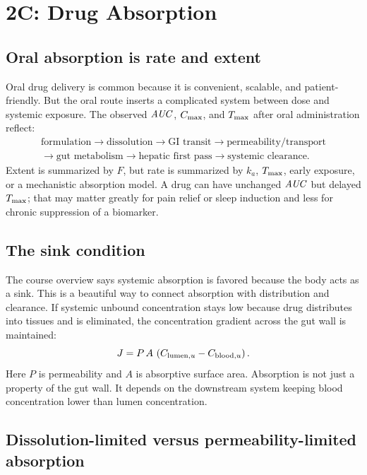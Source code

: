 \documentclass[a4paper]{article}
\newcommand{\AUC}{\ensuremath{\pksym{AUC}}}
\newcommand{\Cmax}{\ensuremath{C_{\pklab{max}}}}
\newcommand{\Tmax}{\ensuremath{T_{\pklab{max}}}}
\newcommand{\Fbio}{\ensuremath{F}}
\newcommand{\ka}{\ensuremath{k_a}}
\begin{document}
\section{2C: Drug Absorption}

\subsection{Oral absorption is rate and extent}

Oral drug delivery is common because it is convenient, scalable, and patient-friendly. But the oral route inserts a complicated system between dose and systemic exposure. The observed \(\AUC\), \(\Cmax\), and \(\Tmax\) after oral administration reflect:
\[
\begin{gathered}
  \text{formulation}
  \rightarrow
  \text{dissolution}
  \rightarrow
  \text{GI transit}
  \rightarrow
  \text{permeability/transport}
  \\
  \rightarrow
  \text{gut metabolism}
  \rightarrow
  \text{hepatic first pass}
  \rightarrow
  \text{systemic clearance}.
\end{gathered}
\]
Extent is summarized by \(\Fbio\), but rate is summarized by \(\ka\), \(\Tmax\), early exposure, or a mechanistic absorption model. A drug can have unchanged \(\AUC\) but delayed \(\Tmax\); that may matter greatly for pain relief or sleep induction and less for chronic suppression of a biomarker.

\subsection{The sink condition}

The course overview says systemic absorption is favored because the body acts as a sink. This is a beautiful way to connect absorption with distribution and clearance. If systemic unbound concentration stays low because drug distributes into tissues and is eliminated, the concentration gradient across the gut wall is maintained:
\[
  J
  =
  P\,A\,\left(C_{\mathrm{lumen},u}-C_{\mathrm{blood},u}\right).
\]
Here \(P\) is permeability and \(A\) is absorptive surface area. Absorption is not just a property of the gut wall. It depends on the downstream system keeping blood concentration lower than lumen concentration.

\subsection{Dissolution-limited versus permeability-limited absorption}
\end{document}
